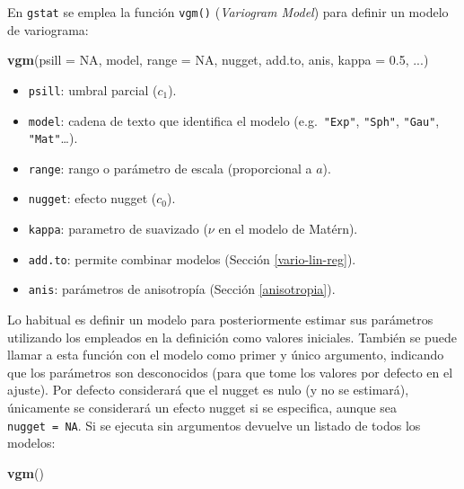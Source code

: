 \documentclass[
]{book}
\newenvironment{Shaded}{\begin{snugshade}}{\end{snugshade}}
\newcommand{\AttributeTok}[1]{\textcolor[rgb]{0.13,0.29,0.53}{#1}}
\newcommand{\ConstantTok}[1]{\textcolor[rgb]{0.56,0.35,0.01}{#1}}
\newcommand{\FloatTok}[1]{\textcolor[rgb]{0.00,0.00,0.81}{#1}}
\newcommand{\FunctionTok}[1]{\textcolor[rgb]{0.13,0.29,0.53}{\textbf{#1}}}
\newcommand{\NormalTok}[1]{#1}
\providecommand{\tightlist}{%
  \setlength{\itemsep}{0pt}\setlength{\parskip}{0pt}}
\theoremstyle{break}
\theoremstyle{definition}
\theoremstyle{definition}
\theoremstyle{definition}
\theoremstyle{definition}
\theoremstyle{remark}
\begin{document}
En \texttt{gstat} se emplea la función \texttt{vgm()} (\emph{Variogram Model}) para definir un modelo de variograma:

\begin{Shaded}
\begin{Highlighting}[]
\FunctionTok{vgm}\NormalTok{(}\AttributeTok{psill =} \ConstantTok{NA}\NormalTok{, model, }\AttributeTok{range =} \ConstantTok{NA}\NormalTok{, nugget, add.to, anis, }\AttributeTok{kappa =} \FloatTok{0.5}\NormalTok{, ...)}
\end{Highlighting}
\end{Shaded}

\begin{itemize}
\tightlist
\item
  \texttt{psill}: umbral parcial (\(c_1\)).
\item
  \texttt{model}: cadena de texto que identifica el modelo (e.g.~\texttt{"Exp"}, \texttt{"Sph"}, \texttt{"Gau"}, \texttt{"Mat"}\ldots).
\item
  \texttt{range}: rango o parámetro de escala (proporcional a \(a\)).
\item
  \texttt{nugget}: efecto nugget (\(c_0\)).
\item
  \texttt{kappa}: parametro de suavizado (\(\nu\) en el modelo de Matérn).
\item
  \texttt{add.to}: permite combinar modelos (Sección \ref{vario-lin-reg}).
\item
  \texttt{anis}: parámetros de anisotropía (Sección \ref{anisotropia}).
\end{itemize}

Lo habitual es definir un modelo para posteriormente estimar sus parámetros utilizando los empleados en la definición como valores iniciales. También se puede llamar a esta función con el modelo como primer y único argumento, indicando que los parámetros son desconocidos (para que tome los valores por defecto en el ajuste). Por defecto considerará que el nugget es nulo (y no se estimará), únicamente se considerará un efecto nugget si se especifica, aunque sea \texttt{nugget\ =\ NA}.
Si se ejecuta sin argumentos devuelve un listado de todos los modelos:

\begin{Shaded}
\begin{Highlighting}[]
\FunctionTok{vgm}\NormalTok{()}
\end{Highlighting}
\end{Shaded}
\end{document}
